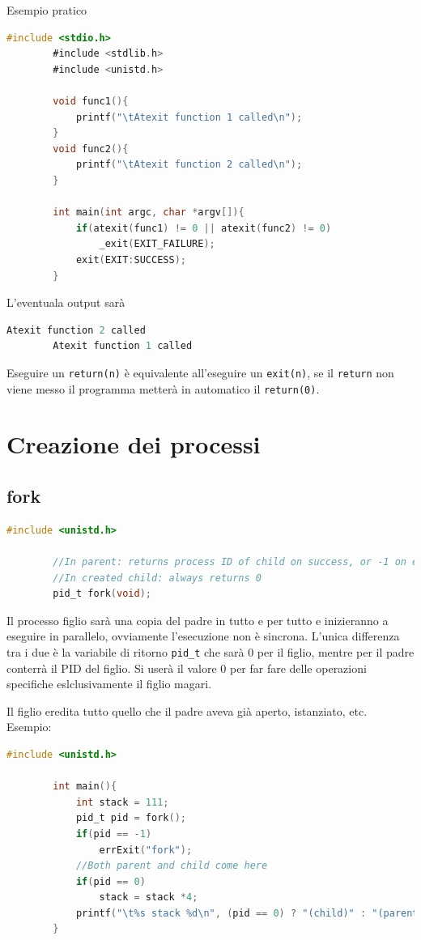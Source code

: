\documentclass[a4paper, 12pt]{book}
\begin{document}
    Esempio pratico
    \begin{lstlisting}[language=C]
        #include <stdio.h>
        #include <stdlib.h>
        #include <unistd.h>

        void func1(){
            printf("\tAtexit function 1 called\n");
        }
        void func2(){
            printf("\tAtexit function 2 called\n");
        }

        int main(int argc, char *argv[]){
            if(atexit(func1) != 0 || atexit(func2) != 0)
                _exit(EXIT_FAILURE);
            exit(EXIT:SUCCESS);
        }
    \end{lstlisting}
    L'eventuala output sarà
    \begin{lstlisting}[language=C]
        Atexit function 2 called
        Atexit function 1 called
    \end{lstlisting}
    Eseguire un \verb|return(n)| è equivalente all'eseguire 
    un \verb|exit(n)|, se il \verb|return| non viene messo il 
    programma metterà in automatico il \verb|return(0)|.

    \section{Creazione dei processi}

    \subsection{fork}

    \begin{lstlisting}[language=C]
        #include <unistd.h>

        //In parent: returns process ID of child on success, or -1 on error
        //In created child: always returns 0
        pid_t fork(void);
    \end{lstlisting}
    Il processo figlio sarà una copia del padre in tutto e per tutto e inizieranno 
    a eseguire in parallelo, ovviamente l'esecuzione non è sincrona. L'unica differenza tra 
    i due è la variabile di ritorno \verb|pid_t| che sarà 0 per il figlio, mentre per il 
    padre conterrà il PID del figlio. Si userà il valore 0 per far fare delle operazioni 
    specifiche eslclusivamente il figlio magari. 

    Il figlio eredita tutto quello che il padre aveva già aperto, istanziato, etc.
    Esempio:
    \begin{lstlisting}[language=C]
        #include <unistd.h>
        
        int main(){
            int stack = 111;
            pid_t pid = fork();
            if(pid == -1)
                errExit("fork");
            //Both parent and child come here 
            if(pid == 0)
                stack = stack *4;
            printf("\t%s stack %d\n", (pid == 0) ? "(child)" : "(parent)", stack);
        }
    \end{lstlisting}
    
\end{document}
